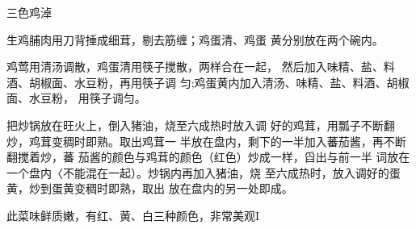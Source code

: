 \begin{recipe}{三色鸡淖}

\ingredients


\cooking

\step 生鸡脯肉用刀背捶成细茸，剔去筋缠；鸡蛋清、鸡蛋 黄分别放在两个碗内。

\step 鸡莺用清汤调散，鸡蛋清用筷子搅散，两样合在一起， 然后加入味精、盐、料酒、胡椒面、水豆粉，再用筷子调 匀;鸡蛋黄内加入清汤、味精、盐、料酒、胡椒面、水豆粉， 用筷子调匀。

\step 把炒锅放在旺火上，倒入猪油，烧至六成热时放入调 好的鸡茸，用瓢子不断翻炒，鸡茸变稠时即熟。取出鸡茸一 半放在盘内，剩下的一半加入蕃茄酱，再不断翻搅着炒，蕃 茄酱的颜色与鸡茸的颜色（红色）炒成一样，舀出与前一半 词放在一个盘内〈不能混在一起）。炒锅内再加入猪油，烧 至六成热时，放入调好的蛋黄，炒到蛋黄变稠时即熟，取出 放在盘内的另一处即成。

\notes

此菜味鲜质嫩，有红、黄、白三种颜色，非常美观I

\end{recipe}

